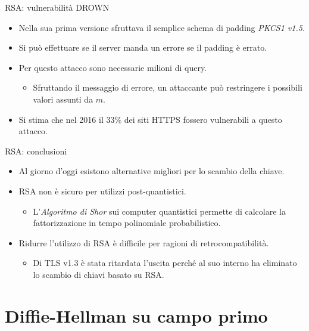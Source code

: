 \documentclass[11pt,svgnames,smaller,aspectratio=169,italian]{beamer}
\begin{document}
\begin{frame}{RSA: vulnerabilità DROWN}
	\begin{itemize}
		\item Nella sua prima versione sfruttava il semplice schema di padding \emph{PKCS1 v1.5}.
		\item Si può effettuare se il server manda un errore se il padding è errato.
		\item Per questo attacco sono necessarie milioni di query.
			\begin{itemize}
				\item Sfruttando il messaggio di errore, un attaccante può restringere i possibili valori assunti da $m$.
			\end{itemize}
		\item Si stima che nel 2016 il 33\% dei siti HTTPS fossero vulnerabili a questo attacco.
	\end{itemize}
\end{frame}


\begin{frame}{RSA: conclusioni}
	\begin{itemize}
		\item Al giorno d'oggi esistono alternative migliori per lo scambio della chiave.
		\item RSA non è sicuro per utilizzi post-quantistici.
			\begin{itemize}
				\item L'\emph{Algoritmo di Shor} sui computer quantistici permette di calcolare la fattorizzazione in tempo polinomiale probabilistico.
			\end{itemize}
		\item Ridurre l'utilizzo di RSA è difficile per ragioni di retrocompatibilità.
			\begin{itemize}
				\item Di TLS v1.3 è stata ritardata l'uscita perché al suo interno ha eliminato lo scambio di chiavi basato su RSA.
			\end{itemize}
	\end{itemize}
\end{frame}

\section{Diffie-Hellman su campo primo}
\begin{frame}
	\sectionpage
	\centering
\end{frame}
\end{document}
